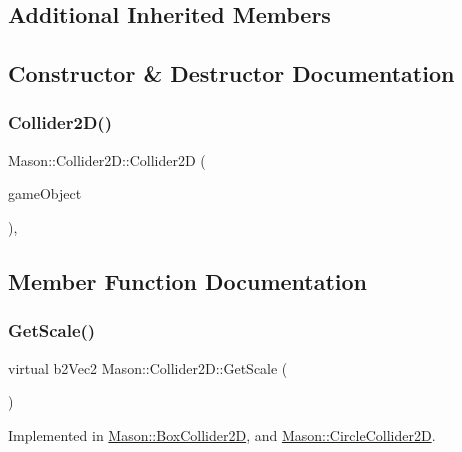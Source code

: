 \subsection*{Additional Inherited Members}


\subsection{Constructor \& Destructor Documentation}
\hypertarget{class_mason_1_1_collider2_d_a7ac26a9d09d5380b49027e9ae50fdacc}{}\label{class_mason_1_1_collider2_d_a7ac26a9d09d5380b49027e9ae50fdacc} 
\subsubsection{\texorpdfstring{Collider2\+D()}{Collider2D()}}
{\footnotesize\ttfamily Mason\+::\+Collider2\+D\+::\+Collider2D (\begin{DoxyParamCaption}\item[{\hyperlink{class_mason_1_1_game_object}{Game\+Object} $\ast$}]{game\+Object }\end{DoxyParamCaption})\hspace{0.3cm}{\ttfamily [inline]}, {\ttfamily [protected]}}



\subsection{Member Function Documentation}
\hypertarget{class_mason_1_1_collider2_d_a3394739f1fea805691ac2753a9272156}{}\label{class_mason_1_1_collider2_d_a3394739f1fea805691ac2753a9272156} 
\subsubsection{\texorpdfstring{Get\+Scale()}{GetScale()}}
{\footnotesize\ttfamily virtual b2\+Vec2 Mason\+::\+Collider2\+D\+::\+Get\+Scale (\begin{DoxyParamCaption}{ }\end{DoxyParamCaption})\hspace{0.3cm}{\ttfamily [pure virtual]}}



Implemented in \hyperlink{class_mason_1_1_box_collider2_d_a396aa615690a67c855b5025e3a1b3bce}{Mason\+::\+Box\+Collider2D}, and \hyperlink{class_mason_1_1_circle_collider2_d_a4aa06f3ff8f00445a78f6b6a8b479ad0}{Mason\+::\+Circle\+Collider2D}.



